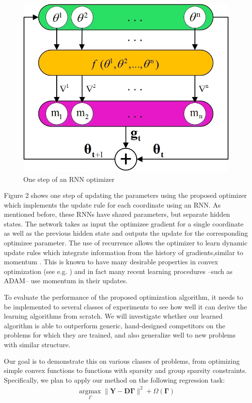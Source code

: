 \documentclass[a4paper, 11pt]{article}
\begin{document}
\begin{figure}[h]
	\centering
	\includegraphics[scale=0.8]{Fig2.jpg}
	\caption{One step of an RNN optimizer}
\end{figure}

Figure 2 shows one step of updating the parameters using the proposed optimizer which implements the update rule for each coordinate using an RNN. As mentioned before, these RNNs have shared parameters, but separate hidden states. The network takes as input the optimizee gradient for a single coordinate as well as the previous hidden state and outputs the update for the corresponding optimizee parameter. The use of recurrence allows the optimizer to learn dynamic update rules which integrate information from the history of gradients,similar to momentum \cite{andrychowicz2016learning}. This is known to have many desirable properties in convex optimization (see e.g. \cite{nesterov1983method}) and in fact many recent learning procedures --such as ADAM-- use momentum in their updates.


 
To evaluate the performance of the proposed optimization algorithm, it needs to be implemented to several classes of experiments to see how well it can derive the learning algorithms from scratch. We will investigate whether our learned algorithm is able to outperform generic, hand-designed competitors on the problems for which they are trained, and also generalize well to new problems with similar structure. 

Our goal is to demonstrate this on various classes of problems, from optimizing simple convex functions to functions with sparsity and group sparsity constraints. Specifically, we plan to apply our method on the following regression task:
\begin{eqnarray}
\underset{\Gamma}{\operatorname{argmax}} \| \mathbf{Y} - \mathbf{D} \mathbf{\Gamma} \|^2 + \Omega (\mathbf{\Gamma})
\end{eqnarray}
\end{document}
